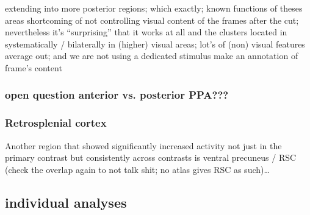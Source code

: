 \documentclass[english]{article}
\begin{document}
extending into more posterior regions; which exactly; known functions of theses
areas
shortcoming of not controlling visual content of the frames after the cut;
nevertheless it's ``surprising'' that it works at all and the clusters located
in systematically / bilaterally in (higher) visual areas; lot's of (non) visual
features average out; and we are not using a dedicated stimulus
make an annotation of frame's content

\subsubsection{open question anterior vs. posterior PPA???}

\subsubsection{Retrosplenial cortex}
Another region that showed significantly increased activity not just in the
primary contrast but consistently across contrasts is ventral precuneus / RSC
(check the overlap again to not talk shit; no atlas gives RSC as such)\dots


\subsection{individual analyses}
\end{document}
